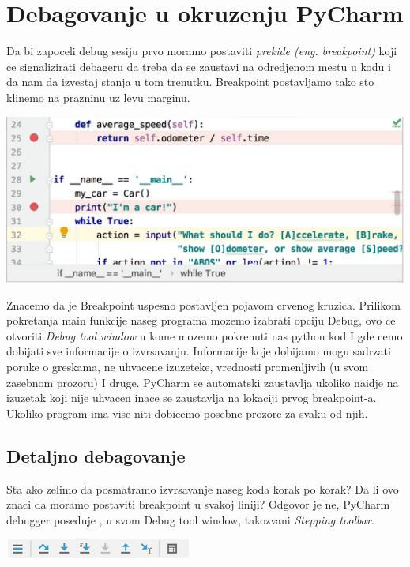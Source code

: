 \documentclass[a4paper]{article}
\begin{document}
\section{Debagovanje u okruzenju PyCharm}
Da bi zapoceli debug sesiju prvo moramo postaviti \emph{prekide (eng. breakpoint)} koji ce signalizirati debageru  da treba da se zaustavi na odredjenom mestu u kodu i da nam da izvestaj stanja u tom trenutku. Breakpoint postavljamo tako sto klinemo na prazninu uz levu marginu.

\includegraphics[scale = 0.4]{1}

Znacemo da je Breakpoint uspesno postavljen pojavom crvenog kruzica. Prilikom pokretanja main funkcije naseg programa mozemo izabrati opciju Debug, ovo ce otvoriti \emph{Debug tool window} u kome mozemo pokrenuti nas python kod I gde cemo dobijati sve informacije o izvrsavanju. Informacije koje dobijamo mogu sadrzati poruke o greskama, ne uhvacene izuzeteke, vrednosti promenljivih (u svom zasebnom prozoru) I druge. PyCharm se automatski zaustavlja ukoliko naidje na izuzetak koji nije uhvacen inace se zaustavlja na lokaciji prvog breakpoint-a. Ukoliko program ima vise niti dobicemo posebne prozore za svaku od njih.
\subsection{Detaljno debagovanje}
Sta ako zelimo da posmatramo izvrsavanje naseg koda korak po korak? Da li ovo znaci da moramo postaviti breakpoint u svakoj liniji? Odgovor je ne, PyCharm debugger poseduje , u svom Debug tool window, takozvani \emph{Stepping toolbar}.

\includegraphics[scale = 0.6]{2}
\end{document}
